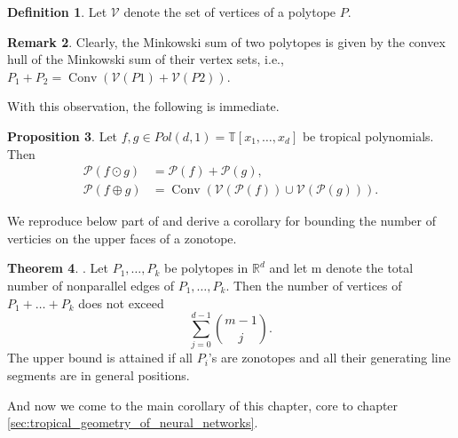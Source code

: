 \documentclass{article}
\theoremstyle{definition}
\newtheorem{theorem}{Theorem}[section]
\newtheorem{definition}[theorem]{Definition}
\newtheorem{proposition}[theorem]{Proposition}
\newtheorem{remark}[theorem]{Remark}
\DeclareMathOperator{\Conv}{Conv}
\begin{document}
\begin{definition}\hspace{1sp}\cite{zhang2018tropical}
Let $\mathcal{V}$ denote the set of vertices of a polytope $P$.
\end{definition}

\begin{remark}\hspace{1sp}\cite{zhang2018tropical}
Clearly, the Minkowski sum of two polytopes is given by the convex hull of the Minkowski sum of their vertex sets, i.e., $P_{1} + P_{2} = \Conv(\mathcal{V}(P1) + \mathcal{V}(P2))$.
\end{remark}
With this observation, the following is immediate.
\begin{proposition}\hspace{1sp}\cite[p.~4]{zhang2018tropical}
\label{prop:p_mult_add}
Let $f, g \in Pol(d, 1) = \mathbb{T}[x_1, \dots , x_d]$ be tropical polynomials. Then
\begin{align*}
\mathcal{P}(f \odot g) &= \mathcal{P}(f) + \mathcal{P}(g), \\
\mathcal{P}(f \oplus g) &= \Conv(\mathcal{V}(\mathcal{P}(f)) \cup \mathcal{V}( \mathcal{P}(g))).
\end{align*}
\end{proposition}

We reproduce below part of \cite[Theorem 2.1.20]{gritzmann1993minkowski} and derive a corollary for bounding the number of verticies on the upper faces of a zonotope.

\begin{theorem}\hspace{1sp}\label{theo:gritzmann_sturmfels}
\cite{gritzmann1993minkowski}. Let $P_1, \dots , P_k$ be polytopes in $\mathbb{R}^{d}$ and let m denote the total number of nonparallel edges of $P_1, \dots , P_k$. Then the number of vertices of $P_1 + \dots + P_k$ does not exceed
$$\sum_{j=0}^{d-1} \binom{m-1}{j}.$$
The upper bound is attained if all $P_i$'s are zonotopes and all their generating line segments are in general positions.
\end{theorem}

And now we come to the main corollary of this chapter, core to chapter \ref{sec:tropical_geometry_of_neural_networks}.
\end{document}
